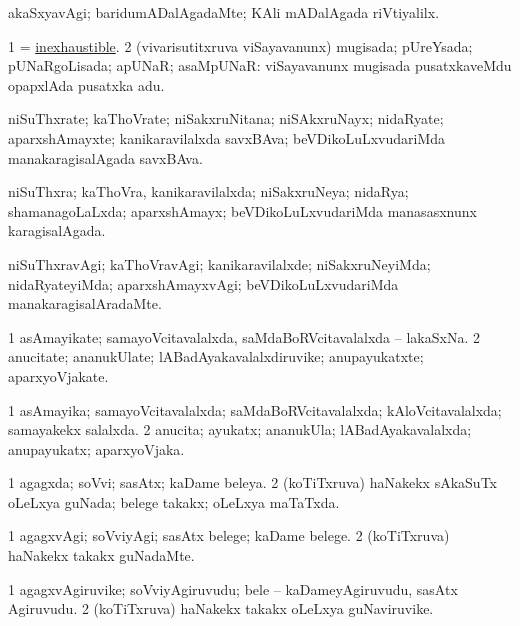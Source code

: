 \bentry
{}
\gl{\kirxvi}
\bmng
akaSxyavAgi; baridumADalAgadaMte; KAli mADalAgada riVtiyalilx. 
\emng
\eentry

\bentry
{}
\gl{\gu}
\bmng
\bnum
\num{1}  = \hyperlink{inexhaustible}{inexhaustible}. 
\num{2} (vivarisutitxruva viSayavanunx) mugisada; pUreYsada; pUNaRgoLisada; apUNaR; asaMpUNaR:  viSayavanunx mugisada pusatxkaveMdu opapxlAda pusatxka adu. 
\enum
\emng
\eentry

\bentry
{}
\gl{\nA}
\bmng
niSuThxrate; kaThoVrate; niSakxruNitana; niSAkxruNayx; nidaRyate; aparxshAmayxte; kanikaravilalxda savxBAva; beVDikoLuLxvudariMda manakaragisalAgada savxBAva. 
\emng
\eentry

\bentry
{}
\gl{\gu}
\bmng
niSuThxra; kaThoVra, kanikaravilalxda; niSakxruNeya; nidaRya; shamanagoLaLxda; aparxshAmayx; beVDikoLuLxvudariMda manasasxnunx karagisalAgada. 
\emng
\eentry

\bentry
{}
\gl{\kirxvi}
\bmng
niSuThxravAgi; kaThoVravAgi; kanikaravilalxde; niSakxruNeyiMda; nidaRyateyiMda; aparxshAmayxvAgi; beVDikoLuLxvudariMda manakaragisalAradaMte. 
\emng
\eentry

\bentry
{}
\gl{\nA}
\bmng
\bnum
\num{1} asAmayikate; samayoVcitavalalxda, saMdaBoRVcitavalalxda -- lakaSxNa. 
\num{2} anucitate; ananukUlate; lABadAyakavalalxdiruvike; anupayukatxte; aparxyoVjakate. 
\enum
\emng
\eentry

\bentry
{}
\gl{\gu}
\bmng
\bnum
\num{1} asAmayika; samayoVcitavalalxda; saMdaBoRVcitavalalxda; kAloVcitavalalxda; samayakekx salalxda. 
\num{2} anucita; ayukatx; ananukUla; lABadAyakavalalxda; anupayukatx; aparxyoVjaka. 
\enum
\emng
\eentry

\bentry
{}
\gl{\gu}
\bmng
\bnum
\num{1} agagxda; soVvi; sasAtx; kaDame beleya. 
\num{2} (koTiTxruva) haNakekx sAkaSuTx oLeLxya guNada; belege takakx; oLeLxya maTaTxda. 
\enum
\emng
\eentry

\bentry
{}
\gl{\kirxvi}
\bmng
\bnum
\num{1} agagxvAgi; soVviyAgi; sasAtx belege; kaDame belege. 
\num{2} (koTiTxruva) haNakekx takakx guNadaMte. 
\enum
\emng
\eentry

\bentry
{}
\gl{\nA}
\bmng
\bnum
\num{1} agagxvAgiruvike; soVviyAgiruvudu; bele -- kaDameyAgiruvudu, sasAtx Agiruvudu. 
\num{2} (koTiTxruva) haNakekx takakx oLeLxya guNaviruvike. 
\enum
\emng
\eentry

